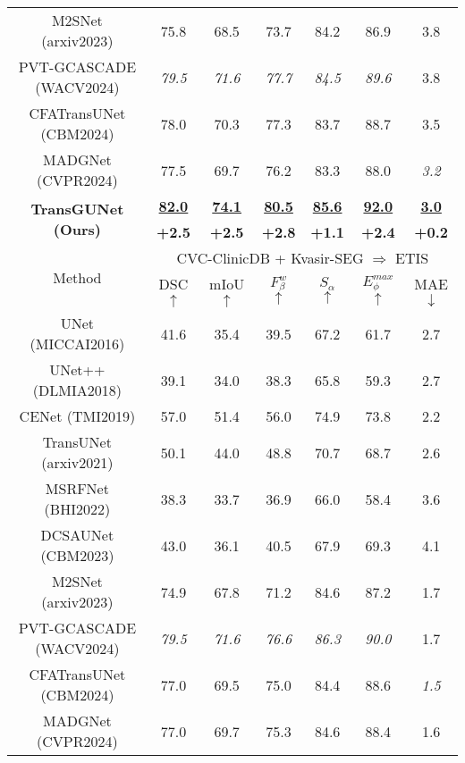 \begin{table}[h]
\begin{tabular}{c|cccccc}
     M2SNet \tiny{(arxiv2023)}      & 75.8 & 68.5 & 73.7 & 84.2 & 86.9 & 3.8 \\
     PVT-GCASCADE \tiny{(WACV2024)} & \textit{79.5} & \textit{71.6} & \textit{77.7} & \textit{84.5} & \textit{89.6} & 3.8 \\
     CFATransUNet \tiny{(CBM2024)}  & 78.0 & 70.3 & 77.3 & 83.7 & 88.7 & 3.5 \\
     MADGNet \tiny{(CVPR2024)}      & 77.5 & 69.7 & 76.2 & 83.3 & 88.0 & \textit{3.2} \\
     \hline
     \multicolumn{1}{c|}{\multirow{2}{*}{\textbf{TransGUNet \tiny{(Ours)}}}}     & \textbf{\underline{82.0}} & \textbf{\underline{74.1}} & \textbf{\underline{80.5}} & \textbf{\underline{85.6}} & \textbf{\underline{92.0}} & \textbf{\underline{3.0}} \\ \cline{2-7}
     & \textbf{+2.5} & \textbf{+2.5} & \textbf{+2.8} & \textbf{+1.1} & \textbf{+2.4} & \textbf{+0.2} \\
    \hline
    \multicolumn{1}{c|}{\multirow{2}{*}{Method}} & \multicolumn{6}{c}{CVC-ClinicDB + Kvasir-SEG $\Rightarrow$ ETIS} \\ \cline{2-7}
    & DSC \scriptsize{$\uparrow$} & mIoU \scriptsize{$\uparrow$} & $F_{\beta}^{w}$ \scriptsize{$\uparrow$}  & $S_{\alpha}$ \scriptsize{$\uparrow$} & $E_{\phi}^{max}$ \scriptsize{$\uparrow$} & MAE \scriptsize{$\downarrow$} \\
    \hline
     UNet \tiny{(MICCAI2016)}       & 41.6 & 35.4 & 39.5 & 67.2 & 61.7 & 2.7 \\
     UNet++ \tiny{(DLMIA2018)}      & 39.1 & 34.0 & 38.3 & 65.8 & 59.3 & 2.7 \\
     CENet \tiny{(TMI2019)}         & 57.0 & 51.4 & 56.0 & 74.9 & 73.8 & 2.2 \\
     TransUNet \tiny{(arxiv2021)}   & 50.1 & 44.0 & 48.8 & 70.7 & 68.7 & 2.6 \\
     MSRFNet \tiny{(BHI2022)}       & 38.3 & 33.7 & 36.9 & 66.0 & 58.4 & 3.6 \\
     DCSAUNet \tiny{(CBM2023)}      & 43.0 & 36.1 & 40.5 & 67.9 & 69.3 & 4.1 \\
     M2SNet \tiny{(arxiv2023)}      & 74.9 & 67.8 & 71.2 & 84.6 & 87.2 & 1.7 \\
     PVT-GCASCADE \tiny{(WACV2024)} & \textit{79.5} & \textit{71.6} & \textit{76.6} & \textit{86.3} & \textit{90.0} & 1.7 \\
     CFATransUNet \tiny{(CBM2024)}  & 77.0 & 69.5 & 75.0 & 84.4 & 88.6 & \textit{1.5} \\
     MADGNet \tiny{(CVPR2024)}      & 77.0 & 69.7 & 75.3 & 84.6 & 88.4 & 1.6 \\

\end{tabular}
\end{table}
